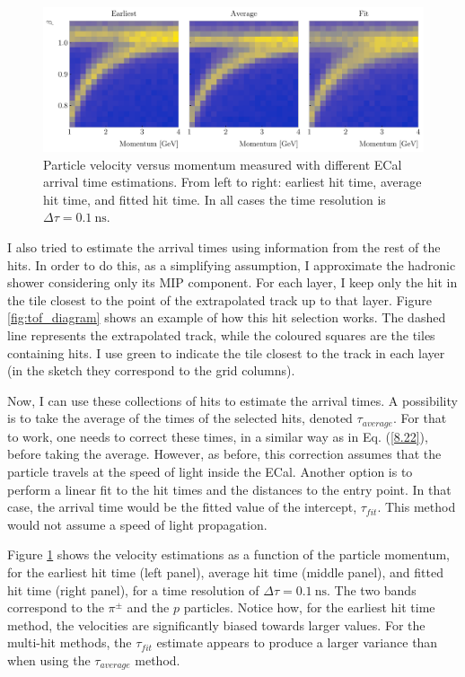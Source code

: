 \begin{figure}[t]
	\centering
	\includegraphics[width=.99\linewidth]{Images/GArSoft_PID/tof/beta_vs_momentum_comparison_delta_0.1.pdf}
	\caption[Particle velocity versus momentum measured with different ECal arrival time estimations.]{Particle velocity versus momentum measured with different ECal arrival time estimations. From left to right: earliest hit time, average hit time, and fitted hit time. In all cases the time resolution is $\Delta \tau = 0.1 ~ \mathrm{ns}$.}
	\label{fig:tof_beta_comp}
\end{figure}

I also tried to estimate the arrival times using information from the rest of the hits. In order to do this, as a simplifying assumption, I approximate the hadronic shower considering only its MIP component. For each layer, I keep only the hit in the tile closest to the point of the extrapolated track up to that layer. Figure \ref{fig:tof_diagram} shows an example of how this hit selection works. The dashed line represents the extrapolated track, while the coloured squares are the tiles containing hits. I use green to indicate the tile closest to the track in each layer (in the sketch they correspond to the grid columns).

Now, I can use these collections of hits to estimate the arrival times. A possibility is to take the average of the times of the selected hits, denoted $\tau_{average}$. For that to work, one needs to correct these times, in a similar way as in Eq. (\ref{8.22}), before taking the average. However, as before, this correction assumes that the particle travels at the speed of light inside the ECal. Another option is to perform a linear fit to the hit times and the distances to the entry point. In that case, the arrival time would be the fitted value of the intercept, $\tau_{fit}$. This method would not assume a speed of light propagation.

Figure \ref{fig:tof_beta_comp} shows the velocity estimations as a function of the particle momentum, for the earliest hit time (left panel), average hit time (middle panel), and fitted hit time (right panel), for a time resolution of $\Delta \tau = 0.1 ~ \mathrm{ns}$. The two bands correspond to the $\pi^{\pm}$ and the $p$ particles. Notice how, for the earliest hit time method, the velocities are significantly biased towards larger values. For the multi-hit methods, the $\tau_{fit}$ estimate appears to produce a larger variance than when using the $\tau_{average}$ method.

